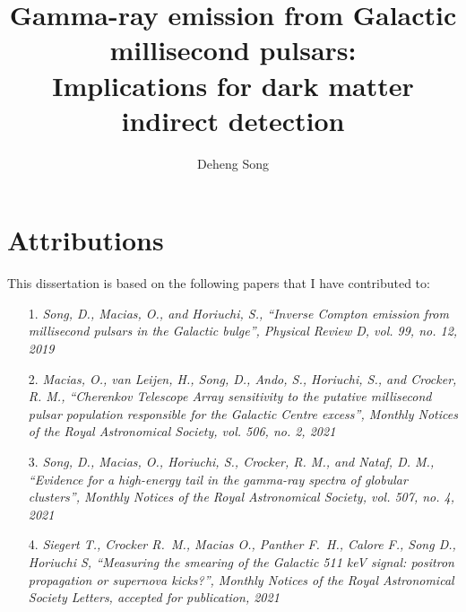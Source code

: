 \documentclass[doublespace,nopageskip]{VTthesis} %
\title{Gamma-ray emission from Galactic millisecond pulsars: \\Implications for dark matter indirect detection}
\author{Deheng Song}
\begin{document}
\frontmatter
\maketitle

\chapter*{Attributions}

This dissertation is based on the following papers that I have contributed to:
\begin{itemize}
    \item[1.] \emph{Song, D., Macias, O., and Horiuchi, S., “Inverse Compton emission from millisecond pulsars in the Galactic bulge”, Physical Review D, vol. 99, no. 12, 2019}
    \item[2.] \emph{Macias, O., van Leijen, H., Song, D., Ando, S., Horiuchi, S., and Crocker, R. M., “Cherenkov Telescope Array sensitivity to the putative millisecond pulsar population responsible for the Galactic Centre excess”, Monthly Notices of the Royal Astronomical Society, vol. 506, no. 2, 2021}
    \item[3.] \emph{Song, D., Macias, O., Horiuchi, S., Crocker, R. M., and Nataf, D. M., “Evidence for a high-energy tail in the gamma-ray spectra of globular clusters”, Monthly Notices of the Royal Astronomical Society, vol. 507, no. 4, 2021}
    \item[4.] \emph{Siegert T., Crocker R.~M., Macias O., Panther F.~H., Calore F., Song D., Horiuchi S, “Measuring the smearing of the Galactic 511 keV signal: positron propagation or supernova kicks?”, Monthly Notices of the Royal Astronomical Society Letters, accepted for publication, 2021}
\end{itemize}

\tableofcontents

\listoffigures
\listoftables

\end{document}
